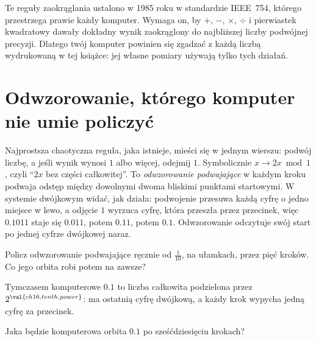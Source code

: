 \begin{note}
Te reguły zaokrąglania ustalono w 1985 roku w standardzie IEEE~754, którego
przestrzega prawie każdy komputer. Wymaga on, by $+$, $-$, $\times$, $\div$ i
pierwiastek kwadratowy dawały dokładny wynik zaokrąglony do najbliższej
liczby podwójnej precyzji. Dlatego twój komputer powinien się zgadzać z każdą
liczbą wydrukowaną w tej książce: jej własne pomiary używają tylko tych
działań.
\end{note}

\section{Odwzorowanie, którego komputer nie umie policzyć}
\label{sec:ch16-doubling}

\noindent
Najprostsza chaotyczna reguła, jaka istnieje, mieści się w jednym wierszu:
podwój liczbę, a jeśli wynik wynosi $1$ albo więcej, odejmij $1$.
Symbolicznie $x \to 2x \bmod 1$, czyli \enquote{$2x$ bez części całkowitej}.
To \emph{odwzorowanie podwajające} w każdym kroku podwaja odstęp między
dowolnymi dwoma bliskimi punktami startowymi. W systemie dwójkowym widać, jak
działa: podwojenie przesuwa każdą cyfrę o jedno miejsce w lewo, a odjęcie
$1$ wyrzuca cyfrę, która przeszła przez przecinek, więc $\num{0.1011}$ staje
się $\num{0.011}$, potem $\num{0.11}$, potem $\num{0.1}$. Odwzorowanie
odczytuje swój start po jednej cyfrze dwójkowej naraz.

\begin{think}
Policz odwzorowanie podwajające ręcznie od $\tfrac{1}{10}$, na ułamkach,
przez pięć kroków. Co jego orbita robi potem na zawsze?
\end{think}
Tymczasem komputerowe $\num{0.1}$ to liczba całkowita podzielona przez
$2^{\val{ch16.tenth.power}}$: ma ostatnią cyfrę dwójkową, a każdy krok
wypycha jedną cyfrę za przecinek.

\begin{think}
Jaka będzie komputerowa orbita $\num{0.1}$ po sześćdziesięciu krokach?
\end{think}



